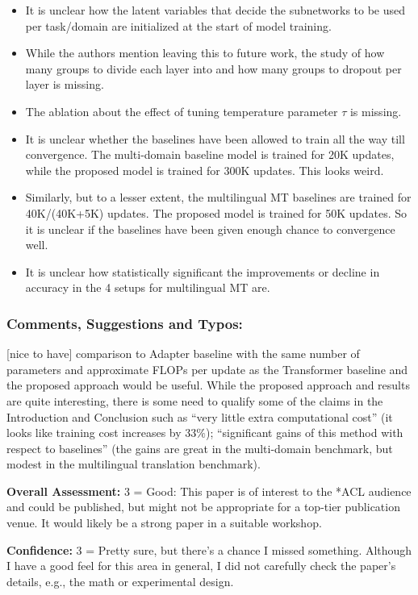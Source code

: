 \documentclass[12pt,times,a4paper,twoside]{article}
\theoremstyle{definition}
\begin{document}
\begin{itemize}
\item It is unclear how the latent variables that decide the subnetworks to be used per task/domain are initialized at the start of model training.
\item While the authors mention leaving this to future work, the study of how many groups to divide each layer into and how many groups to dropout per layer is missing.
\item The ablation about the effect of tuning temperature parameter $\tau$ is missing.
\item It is unclear whether the baselines have been allowed to train all the way till convergence. The multi-domain baseline model is trained for 20K updates, while the proposed model is trained for 300K updates. This looks weird.
\item Similarly, but to a lesser extent, the multilingual MT baselines are trained for 40K/(40K+5K) updates. The proposed model is trained for 50K updates. So it is unclear if the baselines have been given enough chance to convergence well.
\item It is unclear how statistically significant the improvements or decline in accuracy in the 4 setups for multilingual MT are.
\end{itemize}

\subsubsection*{Comments, Suggestions and Typos:}
[nice to have] comparison to Adapter baseline with the same number of parameters and approximate FLOPs per update as the Transformer baseline and the proposed approach would be useful.
While the proposed approach and results are quite interesting, there is some need to qualify some of the claims in the Introduction and Conclusion such as “very little extra computational cost” (it looks like training cost increases by 33$\%$); “significant gains of this method with respect to baselines” (the gains are great in the multi-domain benchmark, but modest in the multilingual translation benchmark).

\textbf{Overall Assessment:} 3 = Good: This paper is of interest to the *ACL audience and could be published, but might not be appropriate for a top-tier publication venue. It would likely be a strong paper in a suitable workshop.

\textbf{Confidence:} 3 =  Pretty sure, but there's a chance I missed something. Although I have a good feel for this area in general, I did not carefully check the paper's details, e.g., the math or experimental design.
\end{document}
